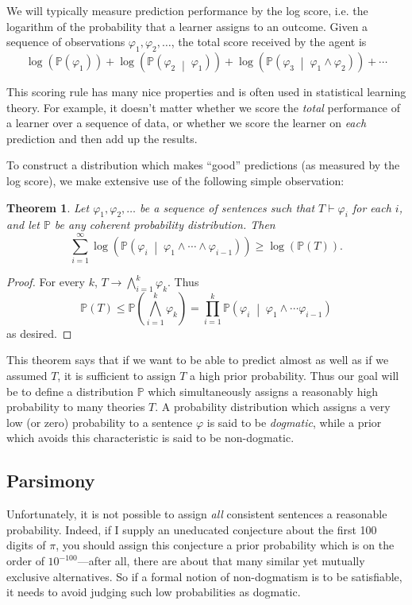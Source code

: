 \documentclass[12pt]{article}
\newtheorem{theorem}{Theorem}
\theoremstyle{definition}
\newcommand{\of}[1]{\left(#1\right)}
\newcommand{\ofc}[2]{\left(#1\;\middle\vert\;#2\right)}
\newcommand{\PP}{\mathbb{P}}
\newcommand{\Pc}[2]{\PP\ofc{#1}{#2}}
\renewcommand{\P}[1]{\mathbb{P}\of{#1}}
\newcommand{\vp}{\varphi}
\begin{document}
We will typically measure prediction performance by the log score,
i.e. the logarithm of the probability that a learner assigns to an outcome.
Given a sequence of observations $\vp_1, \vp_2, \ldots$,
the total score received by the agent is
\[ \log\of{\P{\vp_1}} + \log\of{\Pc{\vp_2}{\vp_1}} + \log\of{\Pc{\vp_3}{\vp_1 \wedge \vp_2}} + \cdots \]

This scoring rule has many nice properties and is often used in statistical
learning theory. %
For example, it doesn't matter whether we score the \emph{total}
performance of a learner over a sequence of data, or whether we score
the learner on \emph{each} prediction and then add up the results.

To construct a distribution which makes ``good'' predictions
(as measured by the log score),
we make extensive use of the following simple observation:
\begin{theorem}\label{learning}
Let $\vp_1, \vp_2, \ldots$ be a sequence of sentences
such that $T \vdash \vp_i$ for each $i$,
and let $\PP$ be any coherent probability distribution.
Then 
\[ \sum_{i = 1}^{\infty} \log\of{\Pc{\vp_i}{\vp_1 \wedge \cdots \wedge \vp_{i-1}}} \geq \log\of{\P{T}}. \]
\end{theorem}
\begin{proof}
For every $k$, $T \rightarrow \bigwedge \limits_{i = 1}^{k} \vp_k$.
Thus
\[
\P{T} 
\leq \P{\bigwedge \limits_{i=1}^k \vp_k}
= \prod_{i = 1}^k \Pc{\vp_i}{\vp_1 \wedge \cdots \vp_{i-1}}
\]
as desired.
\end{proof}

This theorem says that if we want to be able to predict almost
as well as if we assumed $T$, it is sufficient
to assign $T$ a high prior probability.
Thus our goal will be to define a distribution $\PP$ which 
simultaneously assigns a reasonably high probability to many theories $T$.
A probability distribution which assigns a very low (or zero) probability
to a sentence $\vp$ is said to be \emph{dogmatic}, while a prior
which avoids this characteristic is said to be non-dogmatic.

\subsection{Parsimony}\label{parsimony}

Unfortunately, it is not possible to assign \emph{all} consistent
sentences a reasonable probability.
Indeed, if I supply an uneducated conjecture about the first 100 digits of $\pi$,
you should assign this conjecture a prior probability which is on the order
of $10^{-100}$---after all, there are about that many similar
yet mutually exclusive alternatives.
So if a formal notion of non-dogmatism is to be satisfiable,
it needs to avoid judging such low probabilities as dogmatic.
\end{document}
